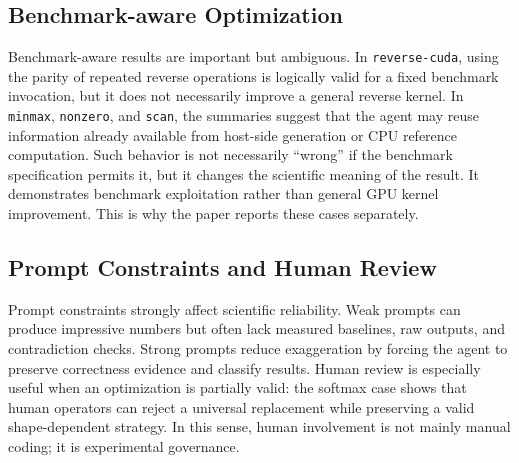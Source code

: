 \documentclass[conference]{IEEEtran}
\begin{document}
\subsection{Benchmark-aware Optimization}

Benchmark-aware results are important but ambiguous. In \texttt{reverse-cuda}, using the parity of repeated reverse operations is logically valid for a fixed benchmark invocation, but it does not necessarily improve a general reverse kernel. In \texttt{minmax}, \texttt{nonzero}, and \texttt{scan}, the summaries suggest that the agent may reuse information already available from host-side generation or CPU reference computation. Such behavior is not necessarily ``wrong'' if the benchmark specification permits it, but it changes the scientific meaning of the result. It demonstrates benchmark exploitation rather than general GPU kernel improvement. This is why the paper reports these cases separately.

\subsection{Prompt Constraints and Human Review}

Prompt constraints strongly affect scientific reliability. Weak prompts can produce impressive numbers but often lack measured baselines, raw outputs, and contradiction checks. Strong prompts reduce exaggeration by forcing the agent to preserve correctness evidence and classify results. Human review is especially useful when an optimization is partially valid: the softmax case shows that human operators can reject a universal replacement while preserving a valid shape-dependent strategy. In this sense, human involvement is not mainly manual coding; it is experimental governance.

\begin{table}[t]
\centering
\caption{Failure and caution taxonomy observed in the project.}
\label{tab:failure}
\footnotesize
{}
\end{table}
\end{document}
